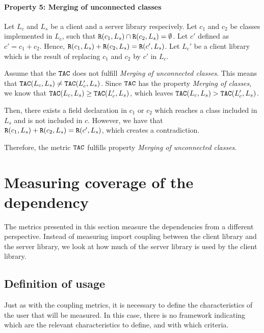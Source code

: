 \paragraph{Property 5: Merging of unconnected classes}
Let $L_c$ and $L_s$ be a client and a server library respecively. Let $c_1$ and $c_2$ be classes implemented in $L_c$, such that $\verb|R|(c_1, L_s) \cap \verb|R|(c_2, L_s) = \emptyset$. Let $c'$ defined as $c' = c_1 + c_2$. Hence, $\verb|R|(c_1, L_s) + \verb|R|(c_2, L_s) = \verb|R|(c', L_s)$. Let $L_c'$ be a client library which is the result of replacing $c_1$ and $c_2$ by $c'$ in $L_c$.

Assume that the $\verb|TAC|$ does not fulfill \textit{Merging of unconnected classes}. This means that $\verb|TAC|(L_c, L_s) \neq \verb|TAC|(L_c', L_s)$. Since $\verb|TAC|$ has the property \textit{Merging of classes}, we know that $\verb|TAC|(L_c, L_s) \geq \verb|TAC|(L_c', L_s)$, which leaves $\verb|TAC|(L_c, L_s) > \verb|TAC|(L_c', L_s)$.

Then, there exists a field declaration in $c_1$ or $c_2$ which reaches a class included in $L_s$ and is not included in $c$. However, we have that $\verb|R|(c_1, L_s) + \verb|R|(c_2, L_s) = \verb|R|(c', L_s)$, which creates a contradiction.

Therefore, the metric $\verb|TAC|$ fulfills property \textit{Merging of unconnected classes}.

\section{Measuring coverage of the dependency}
The metrics presented in this section measure the dependencies from a different perspective. Instead of measuring import coupling between the client library and the server library, we look at how much of the server library is used by the client library.


\subsection{Definition of usage}\label{subsect:usage-definition}
Just as with the coupling metrics, it is necessary to define the characteristics of the user that will be measured. In this case, there is no framework indicating which are the relevant characteristics to define, and with which criteria.

